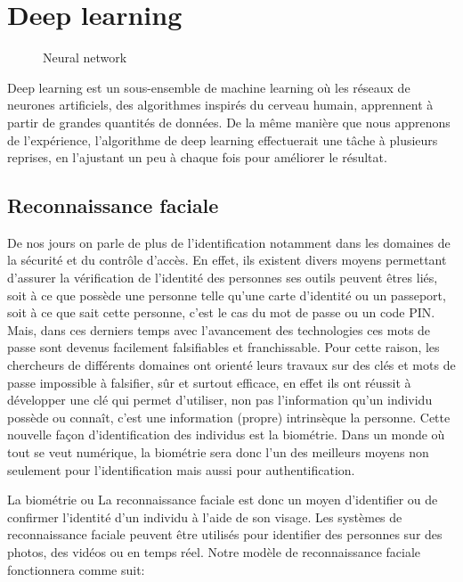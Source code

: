 {%

\pagebreak
{}

\chapter{Deep learning}\thispagestyle{fancy}
\begin{figure}
\centering
{}
\caption{Neural network}
\label{fig:figure2}
\end{figure} 
Deep learning est un sous-ensemble de machine learning où les réseaux de neurones artificiels, des algorithmes inspirés du cerveau humain, apprennent à partir de grandes quantités de données. De la même manière que nous apprenons de l'expérience, l'algorithme de deep learning effectuerait une tâche à plusieurs reprises, en l'ajustant un peu à chaque fois pour améliorer le résultat.\\[1cm]

\section{Reconnaissance faciale}
De nos jours on parle de plus de l'identification  notamment dans les domaines de la sécurité et du contrôle d’accès. En effet, ils existent divers moyens permettant d’assurer  la vérification de l'identité  des personnes ses outils peuvent êtres  liés, soit à ce  que possède une personne telle qu’une carte d’identité ou un passeport, soit à ce que sait cette personne, c’est le cas du mot de passe ou un code PIN.  Mais, dans ces derniers temps avec l’avancement  des technologies ces mots de passe sont devenus facilement falsifiables et franchissable. Pour cette raison, les chercheurs de différents domaines ont orienté leurs travaux sur des clés et mots de passe impossible à falsifier, sûr et surtout efficace, en effet ils ont réussit à développer  une clé qui permet d’utiliser, non pas l’information qu’un individu possède ou connaît, c’est une information (propre) intrinsèque la  personne. Cette nouvelle façon d’identification des individus est la biométrie. Dans un monde où tout se veut numérique, la biométrie sera donc l’un des meilleurs moyens non seulement pour l'identification mais aussi pour authentification.

La biométrie ou La reconnaissance faciale est donc un moyen d'identifier ou de confirmer l'identité d'un individu à l'aide de son visage. Les systèmes de reconnaissance faciale peuvent être utilisés pour identifier des personnes sur des photos, des vidéos ou en temps réel. Notre modèle de reconnaissance faciale fonctionnera comme suit:\\

}
